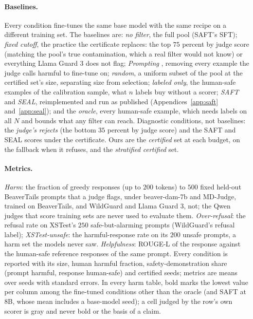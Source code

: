 \documentclass{article} %
\begin{document}
\paragraph{Baselines.} Every condition fine-tunes the same base model with the same recipe on a different training set. The baselines are: \emph{no filter}, the full pool (SAFT's SFT); \emph{fixed cutoff}, the practice the certificate replaces: the top $75$ percent by judge score (matching the pool's true contamination, which a real filter would not know) or everything Llama Guard 3 does not flag; \emph{Prompting} \citep{choi2024saft}, removing every example the judge calls harmful to fine-tune on; \emph{random}, a uniform subset of the pool at the certified set's size, separating size from selection; \emph{labeled only}, the human-safe examples of the calibration sample, what $n$ labels buy without a scorer; \emph{SAFT} and \emph{SEAL}, reimplemented and run as published (Appendices~\ref{app:saft} and~\ref{app:seal}); and the \emph{oracle}, every human-safe example, which needs labels on all $N$ and bounds what any filter can reach. Diagnostic conditions, not baselines: the \emph{judge's rejects} (the bottom $35$ percent by judge score) and the SAFT and SEAL scores under the certificate. Ours are the \emph{certified} set at each budget, on the fallback when it refuses, and the \emph{stratified certified} set.

\paragraph{Metrics.} \emph{Harm}: the fraction of greedy responses (up to $200$ tokens) to $500$ fixed held-out BeaverTails prompts that a judge flags, under beaver-dam-7b and MD-Judge, trained on BeaverTails, and WildGuard and Llama Guard 3, not; the Qwen judges that score training sets are never used to evaluate them. \emph{Over-refusal}: the refusal rate on XSTest's $250$ safe-but-alarming prompts \citep{rottger2024xstest} (WildGuard's refusal label); \emph{XSTest-unsafe}: the harmful-response rate on its $200$ unsafe prompts, a harm set the models never saw. \emph{Helpfulness}: ROUGE-L \citep{lin2004rouge} of the response against the human-safe reference responses of the same prompt. Every condition is reported with its size, human harmful fraction, safety-demonstration share (prompt harmful, response human-safe) and certified seeds; metrics are means over seeds with standard errors. In every harm table, bold marks the lowest value per column among the fine-tuned conditions other than the oracle (and SAFT at 8B, whose mean includes a base-model seed); a cell judged by the row's own scorer is gray and never bold or the basis of a claim.
\end{document}
